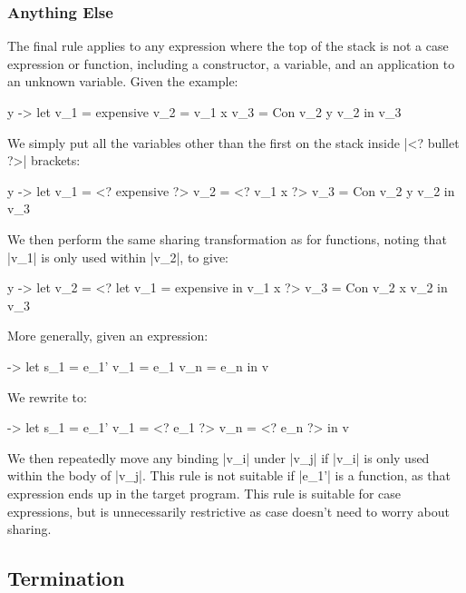 \documentclass[draft]{sigplanconf}
\begin{document}
\subsubsection{Anything Else}

The final rule applies to any expression where the top of the stack is not a case expression or function, including a constructor, a variable, and an application to an unknown variable. Given the example:

\begin{code}
\x y ->  let  v_1 = expensive
              v_2 = v_1 x
              v_3 = Con v_2 y v_2
         in   v_3
\end{code}

We simply put all the variables other than the first on the stack inside |<? bullet ?>| brackets:

\begin{code}
\x y ->  let  v_1 = <? expensive ?>
              v_2 = <? v_1 x ?>
              v_3 = Con v_2 y v_2
         in   v_3
\end{code}

We then perform the same sharing transformation as for functions, noting that |v_1| is only used within |v_2|, to give:

\begin{code}
\x y ->  let  v_2 = <? let v_1 = expensive in v_1 x ?>
              v_3 = Con v_2 x v_2
         in   v_3
\end{code}

More generally, given an expression:

\begin{code}
\free ->  let  s_1 = e_1'
               v_1 = e_1
               v_n = e_n
          in   v
\end{code}

We rewrite to:

\begin{code}
\free ->  let  s_1 = e_1'
               v_1 = <? e_1 ?>
               v_n = <? e_n ?>
          in   v
\end{code}

We then repeatedly move any binding |v_i| under |v_j| if |v_i| is only used within the body of |v_j|. This rule is not suitable if |e_1'| is a function, as that expression ends up in the target program. This rule is suitable for case expressions, but is unnecessarily restrictive as case doesn't need to worry about sharing.

\subsection{Termination}
\label{sec:term}
\end{document}
